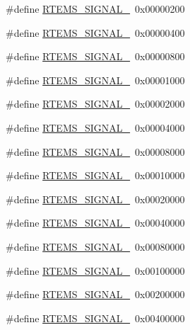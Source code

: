 \begin{DoxyCompactItemize}
\#define \mbox{\hyperlink{group__ClassicASR_ga936c6c5c5a804d30bf4181ea2667e390}{R\+T\+E\+M\+S\+\_\+\+S\+I\+G\+N\+A\+L\+\_}}~0x00000200
\item 
\#define \mbox{\hyperlink{group__ClassicASR_ga57bd58b5327c26100257d3f93a893901}{R\+T\+E\+M\+S\+\_\+\+S\+I\+G\+N\+A\+L\+\_}}~0x00000400
\item 
\#define \mbox{\hyperlink{group__ClassicASR_gaec3c3e01724569f15a735c5ffab751b2}{R\+T\+E\+M\+S\+\_\+\+S\+I\+G\+N\+A\+L\+\_}}~0x00000800
\item 
\#define \mbox{\hyperlink{group__ClassicASR_ga27f53fcd28e430eacaf47515b9f731db}{R\+T\+E\+M\+S\+\_\+\+S\+I\+G\+N\+A\+L\+\_}}~0x00001000
\item 
\#define \mbox{\hyperlink{group__ClassicASR_ga0d864904f68da703fd550a3ed56fa30b}{R\+T\+E\+M\+S\+\_\+\+S\+I\+G\+N\+A\+L\+\_}}~0x00002000
\item 
\#define \mbox{\hyperlink{group__ClassicASR_ga45e55ff0f96c9ddd38affba02d8b339b}{R\+T\+E\+M\+S\+\_\+\+S\+I\+G\+N\+A\+L\+\_}}~0x00004000
\item 
\#define \mbox{\hyperlink{group__ClassicASR_ga401d09197c5a909133fa8ae79c3b8ec7}{R\+T\+E\+M\+S\+\_\+\+S\+I\+G\+N\+A\+L\+\_}}~0x00008000
\item 
\#define \mbox{\hyperlink{group__ClassicASR_ga56d359a5054a316cd4d7f09a80f0d077}{R\+T\+E\+M\+S\+\_\+\+S\+I\+G\+N\+A\+L\+\_}}~0x00010000
\item 
\#define \mbox{\hyperlink{group__ClassicASR_ga2a7ef2148d652d1dc510bd5ca9c10457}{R\+T\+E\+M\+S\+\_\+\+S\+I\+G\+N\+A\+L\+\_}}~0x00020000
\item 
\#define \mbox{\hyperlink{group__ClassicASR_ga5b038f7c69656f14ee4441147193e2ad}{R\+T\+E\+M\+S\+\_\+\+S\+I\+G\+N\+A\+L\+\_}}~0x00040000
\item 
\#define \mbox{\hyperlink{group__ClassicASR_ga28e9e3436c18411b7c83ff7d7cb8bbb8}{R\+T\+E\+M\+S\+\_\+\+S\+I\+G\+N\+A\+L\+\_}}~0x00080000
\item 
\#define \mbox{\hyperlink{group__ClassicASR_ga86e76ab69a836841690f6656a2001d09}{R\+T\+E\+M\+S\+\_\+\+S\+I\+G\+N\+A\+L\+\_}}~0x00100000
\item 
\#define \mbox{\hyperlink{group__ClassicASR_ga6d704faf35f8656484463d164db8dda9}{R\+T\+E\+M\+S\+\_\+\+S\+I\+G\+N\+A\+L\+\_}}~0x00200000
\item 
\#define \mbox{\hyperlink{group__ClassicASR_gac6dd588f82f3463c3555cd52aab5712b}{R\+T\+E\+M\+S\+\_\+\+S\+I\+G\+N\+A\+L\+\_}}~0x00400000
\item 

\end{DoxyCompactItemize}
